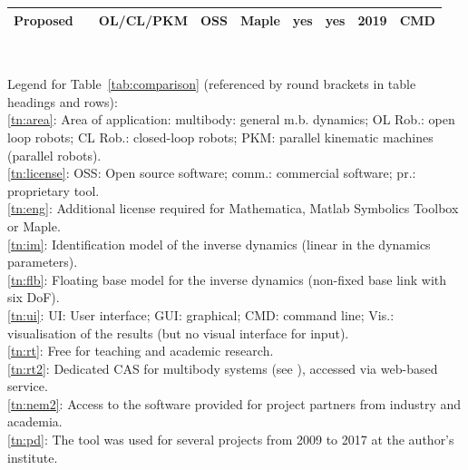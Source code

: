 \documentclass[runningheads]{llncs}
\newcommand{\ok}{{yes}}
\begin{document}
\begin{table}[b!]
\begin{tabular}[t]{|c|c|c|c|c|c|c|c|c|}
		Proposed & & OL/CL/PKM & OSS & Maple & \ok & \ok & 2019 & CMD\\
		\hline
	\end{tabular}
	\\
	\vspace{0.2cm}
	\raggedright
	Legend for Table~\ref{tab:comparison} (referenced by round brackets in table headings and rows):\\
	\ref{tn:area}: Area of application: multibody: general m.b. dynamics; OL Rob.: open loop robots; CL Rob.: closed-loop robots; PKM: parallel kinematic machines (parallel robots). \\
	\ref{tn:license}: OSS: Open source software; comm.: commercial software; pr.: proprietary tool. \\
	\ref{tn:eng}: Additional license required for Mathematica, Matlab Symbolics Toolbox or Maple. \\
	\ref{tn:im}: Identification model of the inverse dynamics (linear in the dynamics parameters). \\
	\ref{tn:flb}: Floating base model for the inverse dynamics (non-fixed base link with six DoF). \\
	\ref{tn:ui}: UI: User interface; GUI: graphical; CMD: command line; Vis.: visualisation of the results (but no visual interface for input).\\
	\ref{tn:rt}: Free for teaching and academic research. \\
	\ref{tn:rt2}: Dedicated CAS for multibody systems (see \cite{SaminFis2003}), accessed via web-based service.\\
	\ref{tn:nem2}: Access to the software provided for project partners from industry and academia. \\
	\ref{tn:pd}: The tool was used for several projects from 2009 to 2017 at the author's institute. \\
\end{table} %
\end{document}
